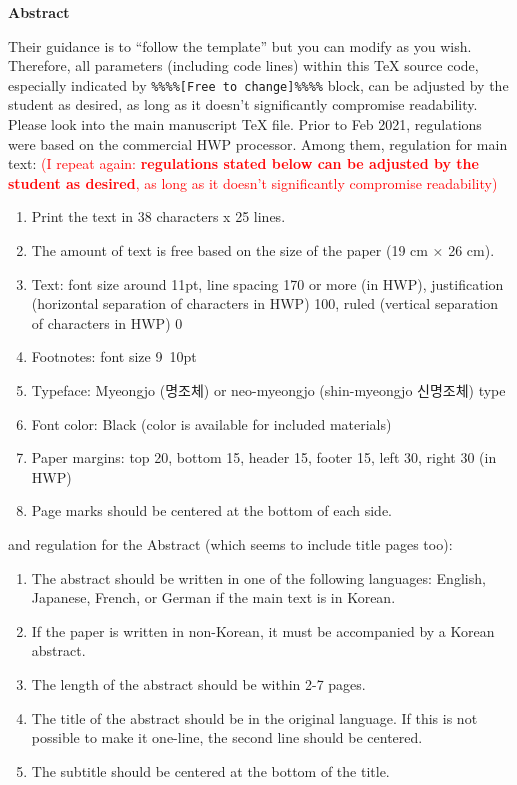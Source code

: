 \documentclass[12pt]{report}
\makeatletter
\renewcommand{\abstractname}{\large Abstract}
\renewenvironment{abstract}{%
    \if@twocolumn
    \section*{\abstractname}%
    \else
    \small
    \begin{center}%
        {\bfseries \abstractname\vspace{-.5em}\vspace{\z@}}%
    \end{center}%
    \quotation
    \fi}
{\if@twocolumn\else\endquotation\fi}
\renewenvironment{abstract}
 {\small
  \begin{center}
  \bfseries \abstractname\vspace{-.5em}\vspace{0pt}
  \end{center}
  \list{}{%
    \setlength{\leftmargin}{10mm}%
    \setlength{\rightmargin}{\leftmargin}%
  }%
  \item\relax}
 {\endlist}
\makeatother
\begin{document}
\begin{abstract}
\quad Their guidance is to ``follow the template'' but you can modify as you wish. Therefore, all parameters (including code lines) within this TeX source code, especially indicated by \texttt{\%\%\%\%[Free to change]\%\%\%\%} block, can be adjusted by the student as desired, as long as it doesn't significantly compromise readability. Please look into the main manuscript TeX file. Prior to Feb 2021, regulations were based on the commercial HWP processor. Among them, regulation for main text: \textcolor{red}{(I repeat again: \textbf{regulations stated below can be adjusted by the student as desired}, as long as it doesn't significantly compromise readability)}
\begin{enumerate}[itemsep=0pt, topsep=0pt, partopsep=0pt]
\item Print the text in 38 characters x 25 lines.
\item The amount of text is free based on the size of the paper (19 cm × 26 cm).
\item Text: font size around 11pt, line spacing 170 or more (in HWP), justification (horizontal separation of characters in HWP) 100, ruled (vertical separation of characters in HWP) 0
\item Footnotes: font size 9~10pt
\item Typeface: Myeongjo (명조체) or neo-myeongjo (shin-myeongjo 신명조체) type
\item Font color: Black (color is available for included materials)
\item Paper margins: top 20, bottom 15, header 15, footer 15, left 30, right 30 (in HWP)
\item Page marks should be centered at the bottom of each side.
\end{enumerate}
and regulation for the Abstract (which seems to include title pages too):
\begin{enumerate}[itemsep=0pt, topsep=0pt, partopsep=0pt]
\item The abstract should be written in one of the following languages: English, Japanese, French, or German if the main text is in Korean.
\item If the paper is written in non-Korean, it must be accompanied by a Korean abstract.
\item The length of the abstract should be within 2-7 pages.
\item The title of the abstract should be in the original language. If this is not possible to make it one-line, the second line should be centered.
\item The subtitle should be centered at the bottom of the title.

\end{enumerate}
\end{abstract}
\end{document}
